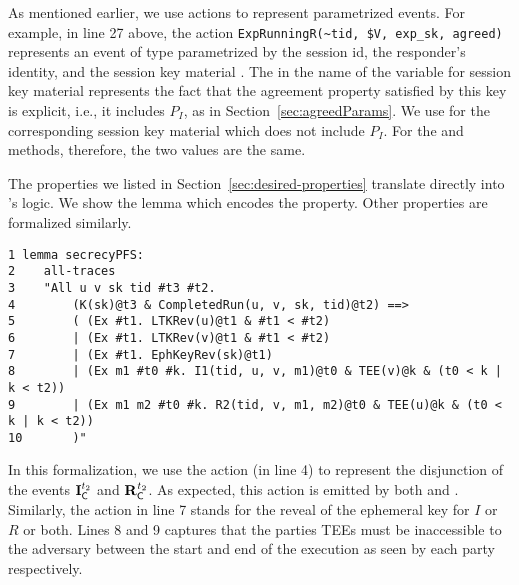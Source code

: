 As mentioned earlier, we use actions to represent parametrized events.
%
For example, in line 27 above, the action
\verb|ExpRunningR(~tid, $V, exp_sk, agreed)| represents an event of type
\mRStart{} parametrized by the session id, the responder's identity, and the
session key material .
%
The  in the name of the variable for session key material represents
the fact that the agreement property satisfied by this key is explicit, i.e.,
it includes $P_{I}$, as in Section~\ref{sec:agreedParams}.
%
We use  for the corresponding session key material which does 
not
include $P_{I}$.
%
For the \mSigSig{} and \mSigStat{} methods, therefore, the two values are the 
same.
%

%

The properties we listed in Section~\ref{sec:desired-properties}
translate directly into \mTamarin's logic.
%
We show the \mTamarin{} lemma which encodes the \mPredPcs{} property.
%
Other properties are formalized similarly. 
%

\begin{small}
\begin{verbatim}
1 lemma secrecyPFS:
2    all-traces
3    "All u v sk tid #t3 #t2.
4        (K(sk)@t3 & CompletedRun(u, v, sk, tid)@t2) ==>
5        ( (Ex #t1. LTKRev(u)@t1 & #t1 < #t2)
6        | (Ex #t1. LTKRev(v)@t1 & #t1 < #t2)
7        | (Ex #t1. EphKeyRev(sk)@t1)
8        | (Ex m1 #t0 #k. I1(tid, u, v, m1)@t0 & TEE(v)@k & (t0 < k | k < t2))
9        | (Ex m1 m2 #t0 #k. R2(tid, v, m1, m2)@t0 & TEE(u)@k & (t0 < k | k < t2))
10       )"
\end{verbatim}
\end{small}
%

In this formalization, we use the action 
(in line 4) to represent the disjunction of the events $\mathbf{I}_{\textsf{C}}^{t_{2}}$
and $\mathbf{R}_{\textsf{C}}^{t_{2}}$.
%
As expected, this action is emitted by both  and .
%
Similarly, the action  in line 7 stands for the reveal of
the ephemeral key for $I$ or $R$ or both.
%
Lines 8 and 9 captures that the parties TEEs must be inaccessible to the
adversary between the start and end of the execution as seen by each party
respectively.
%
